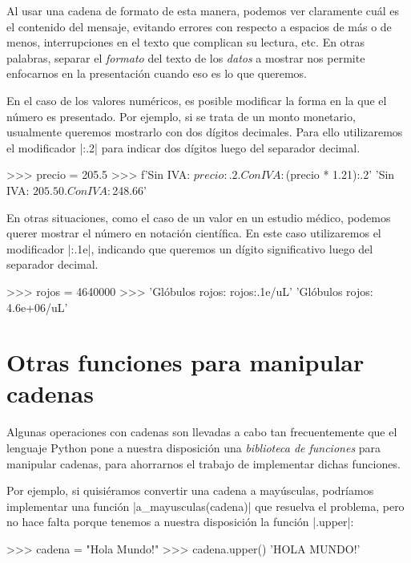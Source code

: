 Al usar una cadena de formato de
esta manera, podemos ver claramente cuál es el contenido del mensaje, evitando
errores con respecto a espacios de más o de menos, interrupciones en el texto
que complican su lectura, etc. En otras palabras, separar el \emph{formato} del texto de los
\emph{datos} a mostrar nos permite enfocarnos en la presentación cuando eso es lo que
queremos.

En el caso de los valores numéricos, es posible modificar la forma en la que el
número es presentado. Por ejemplo, si se trata de un monto monetario, usualmente
queremos mostrarlo con dos dígitos decimales. Para ello utilizaremos el
modificador |:.2| para indicar dos dígitos luego del separador decimal.

\begin{codigo-python-sn}
>>> precio = 205.5
>>> f'Sin IVA: ${precio:.2}. Con IVA: ${(precio * 1.21):.2}'
'Sin IVA: $205.50. Con IVA: $248.66'
\end{codigo-python-sn}

En otras situaciones, como el caso de un valor en un estudio médico, podemos
querer mostrar el número en notación científica. En este caso utilizaremos el
modificador |{:.1e}|, indicando que queremos un dígito significativo luego del separador
decimal.

\begin{codigo-python-sn}
>>> rojos = 4640000
>>> 'Glóbulos rojos: {rojos:.1e}/uL'
'Glóbulos rojos: 4.6e+06/uL'
\end{codigo-python-sn}

\section{Otras funciones para manipular cadenas}

Algunas operaciones con cadenas son llevadas a cabo tan frecuentemente que el lenguaje
Python pone a nuestra disposición una \emph{biblioteca de funciones}
para manipular cadenas, para ahorrarnos el trabajo de implementar dichas
funciones.

Por ejemplo, si quisiéramos convertir una cadena a mayúsculas, podríamos
implementar una función |a_mayusculas(cadena)| que resuelva el problema,
pero no hace falta porque tenemos a nuestra disposición la función |.upper|:

\begin{codigo-python-sn}
>>> cadena = "Hola Mundo!"
>>> cadena.upper()
'HOLA MUNDO!'
\end{codigo-python-sn}

